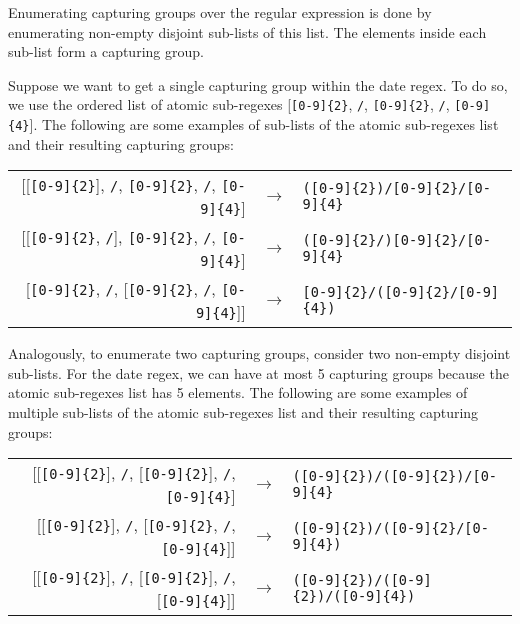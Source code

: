 Enumerating capturing groups over the regular expression is done by enumerating non-empty disjoint sub-lists of this list. The elements inside each sub-list form a capturing group. 

\begin{example}
Suppose we want to get a single capturing group within the date regex. %
To do so, we use the ordered list of atomic sub-regexes [\verb![0-9]{2}!, \verb!/!, \verb![0-9]{2}!, \verb!/!, \verb![0-9]{4}!].
The following are some examples of sub-lists of the atomic sub-regexes list and their resulting capturing groups:

\begin{center}
\setlength{\extrarowheight}{10pt}
\begin{tabular}{rcl}
[[\verb![0-9]{2}!], \verb!/!, \verb![0-9]{2}!, \verb!/!, \verb![0-9]{4}!] & $\rightarrow$ & \verb!([0-9]{2})/[0-9]{2}/[0-9]{4}! \\

[[\verb![0-9]{2}!, \verb!/!], \verb![0-9]{2}!, \verb!/!, \verb![0-9]{4}!] & $\rightarrow$ & \verb!([0-9]{2}/)[0-9]{2}/[0-9]{4}! \\

[\verb![0-9]{2}!, \verb!/!, [\verb![0-9]{2}!, \verb!/!, \verb![0-9]{4}!]] & $\rightarrow$ & \verb![0-9]{2}/([0-9]{2}/[0-9]{4})!
\end{tabular}\bigskip
\end{center}

\noindent
Analogously, to enumerate two capturing groups, consider two non-empty disjoint sub-lists. For the date regex, we can have at most 5 capturing groups because the atomic sub-regexes list has 5 elements. The following are some examples of multiple sub-lists of the atomic sub-regexes list and their resulting capturing groups:

\begin{center}
\setlength{\extrarowheight}{10pt}
\begin{tabular}{rcl}
[[\verb![0-9]{2}!], \verb!/!, [\verb![0-9]{2}!], \verb!/!, \verb![0-9]{4}!] & $\rightarrow$ & \verb!([0-9]{2})/([0-9]{2})/[0-9]{4}! \\

[[\verb![0-9]{2}!], \verb!/!, [\verb![0-9]{2}!, \verb!/!, \verb![0-9]{4}!]] & $\rightarrow$ & \verb!([0-9]{2})/([0-9]{2}/[0-9]{4})! \\

[[\verb![0-9]{2}!], \verb!/!, [\verb![0-9]{2}!], \verb!/!, [\verb![0-9]{4}!]] & $\rightarrow$ & \verb!([0-9]{2})/([0-9]{2})/([0-9]{4})!
\end{tabular}\bigskip
\end{center}
\end{example}

